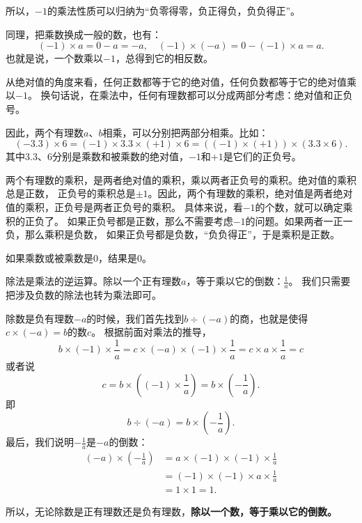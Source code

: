 \documentclass[12pt,UTF8]{ctexbook}
\theoremstyle{definition}
\theoremstyle{plain}
\begin{document}
所以，$-1$的乘法性质可以归纳为“负零得零，负正得负，负负得正”。

同理，把乘数换成一般的数，也有：
$$(-1) \times a =  0 - a = -a, \quad (-1) \times (-a) = 0 - (-1) \times a = a.$$
也就是说，一个数乘以$-1$，总得到它的相反数。

从绝对值的角度来看，任何正数都等于它的绝对值，任何负数都等于它的绝对值乘以$-1$。
换句话说，在乘法中，任何有理数都可以分成两部分考虑：绝对值和正负号。

因此，两个有理数$a$、$b$相乘，可以分别把两部分相乘。比如：
$$ (-3.3) \times 6 = (-1) \times 3.3 \times (+1) \times 6 = ((-1) \times (+1)) \times (3.3 \times 6).$$
其中$3.3$、$6$分别是乘数和被乘数的绝对值，$-1$和$+1$是它们的正负号。

两个有理数的乘积，是两者绝对值的乘积，乘以两者正负号的乘积。绝对值的乘积总是正数，
正负号的乘积总是$\pm 1$。因此，两个有理数的乘积，绝对值是两者绝对值的乘积，正负号是两者正负号的乘积。
具体来说，看$-1$的个数，就可以确定乘积的正负了。
如果正负号都是正数，那么不需要考虑$-1$的问题。如果两者一正一负，那么乘积是负数，
如果正负号都是负数，“负负得正”，于是乘积是正数。

如果乘数或被乘数是$0$，结果是$0$。

除法是乘法的逆运算。除以一个正有理数$a$，等于乘以它的倒数：$\frac{1}{a}$。
我们只需要把涉及负数的除法也转为乘法即可。

除数是负有理数$-a$的时候，我们首先找到$b \div (-a)$的商，也就是使得$c \times (-a) = b$的数$c$。
根据前面对乘法的推导，
$$ b \times (-1) \times \frac{1}{a} = c \times (-a) \times (-1) \times \frac{1}{a} = c \times a \times \frac{1}{a} = c$$
或者说
$$c = b\times \left((-1) \times \frac{1}{a}\right) = b\times \left(-\frac{1}{a}\right) .$$
即
$$b \div (-a) = b\times \left(-\frac{1}{a}\right). $$
最后，我们说明$-\frac{1}{a}$是$-a$的倒数：
\begin{align*}
    (-a) \times \left(-\frac{1}{a}\right) &= a \times (-1) \times (-1) \times \frac{1}{a} \\
    &= (-1)\times (-1) \times a \times \frac{1}{a} \\
    &= 1 \times 1 = 1.
\end{align*}

所以，无论除数是正有理数还是负有理数，\textbf{除以一个数，等于乘以它的倒数。}

\begin{center}
\end{center}
\end{document}
